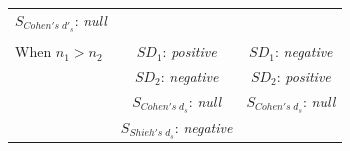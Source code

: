 \documentclass[
  man]{apa6}
\begin{document}
\begin{longtable}[]{@{}lcc@{}}
\begin{minipage}[t]{0.35\columnwidth}
\(S_{Cohen's \; d'_s}\): \emph{null}\strut
\end{minipage}\tabularnewline
\begin{minipage}[t]{0.27\columnwidth}\raggedright
\strut
\end{minipage} & \begin{minipage}[t]{0.29\columnwidth}\centering
\strut
\end{minipage} & \begin{minipage}[t]{0.35\columnwidth}\centering
\strut
\end{minipage}\tabularnewline
\begin{minipage}[t]{0.27\columnwidth}\raggedright
When \(n_1>n_2\)\strut
\end{minipage} & \begin{minipage}[t]{0.29\columnwidth}\centering
\(SD_1\): \emph{positive}\strut
\end{minipage} & \begin{minipage}[t]{0.35\columnwidth}\centering
\(SD_1\): \emph{negative}\strut
\end{minipage}\tabularnewline
\begin{minipage}[t]{0.27\columnwidth}\raggedright
\strut
\end{minipage} & \begin{minipage}[t]{0.29\columnwidth}\centering
\(SD_2\): \emph{negative}\strut
\end{minipage} & \begin{minipage}[t]{0.35\columnwidth}\centering
\(SD_2\): \emph{positive}\strut
\end{minipage}\tabularnewline
\begin{minipage}[t]{0.27\columnwidth}\raggedright
\strut
\end{minipage} & \begin{minipage}[t]{0.29\columnwidth}\centering
\(S_{Cohen's \; d_s}\): \emph{null}\strut
\end{minipage} & \begin{minipage}[t]{0.35\columnwidth}\centering
\(S_{Cohen's \; d_s}\): \emph{null}\strut
\end{minipage}\tabularnewline
\begin{minipage}[t]{0.27\columnwidth}\raggedright
\strut
\end{minipage} & \begin{minipage}[t]{0.29\columnwidth}\centering
\(S_{Shieh's \; d_s}\): \emph{negative}\strut
\end{minipage} & \begin{minipage}[t]{0.35\columnwidth}\centering

\end{minipage}
\end{longtable}
\end{document}
